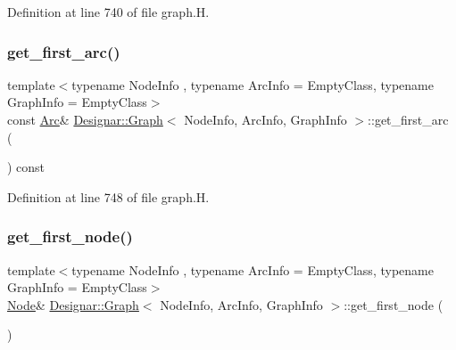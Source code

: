 Definition at line 740 of file graph.\+H.

\mbox{\label{class_designar_1_1_graph_a3a4be7fef798a957b0a66102f1d30c39}} 
\subsubsection{\texorpdfstring{get\+\_\+first\+\_\+arc()}{get\_first\_arc()}\hspace{0.1cm}{\footnotesize\ttfamily [2/2]}}
{\footnotesize\ttfamily template$<$typename Node\+Info , typename Arc\+Info  = Empty\+Class, typename Graph\+Info  = Empty\+Class$>$ \\
const \hyperlink{class_designar_1_1_graph_a74c730ef4ce2d20f998d72bd25c2b5bf}{Arc}\& \hyperlink{class_designar_1_1_graph}{Designar\+::\+Graph}$<$ Node\+Info, Arc\+Info, Graph\+Info $>$\+::get\+\_\+first\+\_\+arc (\begin{DoxyParamCaption}{ }\end{DoxyParamCaption}) const\hspace{0.3cm}{\ttfamily [inline]}}



Definition at line 748 of file graph.\+H.

\mbox{\label{class_designar_1_1_graph_ab9f34a6b6160f9e66a3103c78b13d7d6}} 
\subsubsection{\texorpdfstring{get\+\_\+first\+\_\+node()}{get\_first\_node()}\hspace{0.1cm}{\footnotesize\ttfamily [1/2]}}
{\footnotesize\ttfamily template$<$typename Node\+Info , typename Arc\+Info  = Empty\+Class, typename Graph\+Info  = Empty\+Class$>$ \\
\hyperlink{class_designar_1_1_graph_a5dfc7dba9d092ac489c72e40390c37d0}{Node}\& \hyperlink{class_designar_1_1_graph}{Designar\+::\+Graph}$<$ Node\+Info, Arc\+Info, Graph\+Info $>$\+::get\+\_\+first\+\_\+node (\begin{DoxyParamCaption}{ }\end{DoxyParamCaption})\hspace{0.3cm}{\ttfamily [inline]}}



